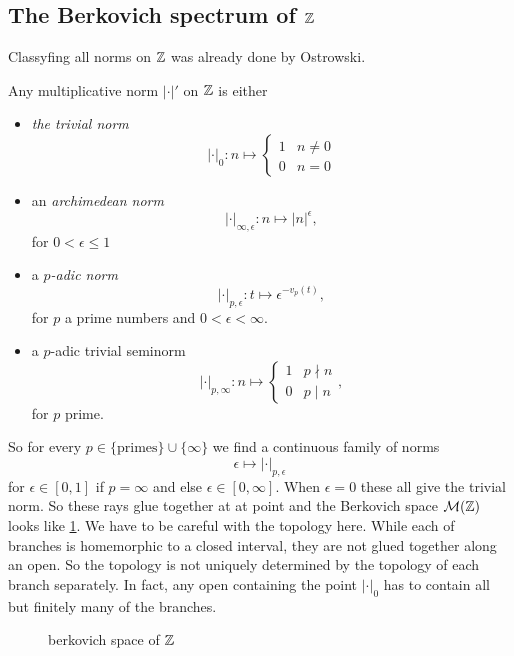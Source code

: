 \subsection{The Berkovich spectrum of $\mathbb{Z}$} \label{sec:the_berkovich_spectrum_of_z}
Classyfing all norms on $\mathbb{Z}$ was already done by Ostrowski.
\begin{theorem}[Ostrowski]\label{thm:ostrowksi}
	Any multiplicative norm $|\cdot |'$ on $\mathbb{Z}$ is either
	\begin{itemize}
		\item \emph{the trivial norm} \[
				|\cdot |_0: n \mapsto \begin{cases}
					1 & n \ne 0 \\
					0 & n = 0
				\end{cases}
			\]
		\item an \emph{archimedean norm} \[
				|\cdot |_{\infty, \epsilon}: n \mapsto |n|^{\epsilon},
			\]
			for $0 <  \epsilon \le 1$
		\item a \emph{$p$-adic norm} \[
				|\cdot |_{p, \epsilon}: t \mapsto \epsilon ^{- v_p(t)},
			\]
			for $p$ a prime numbers and $0 < \epsilon < \infty$. 
		\item a $p$-adic trivial seminorm 
			\[
			|\cdot |_{p, \infty}: n \mapsto \begin{cases}
				1 & p \nmid n \\
				0 & p \mid n
			\end{cases}
			,\] 
			for $p$ prime. 
	\end{itemize}
\end{theorem}
So for every $p \in \{\text{primes}\} \cup \{\infty\} $ we find a continuous family of norms \[
	\epsilon \mapsto|\cdot |_{p, \epsilon}
\] 
for $\epsilon \in [0, 1]$ if $p = \infty$ and else $\epsilon \in [0, \infty]$. 
When $\epsilon = 0$ these all give the trivial norm. 
So these rays glue together at at point and the Berkovich space $\mathcal{M} (\mathbb{Z})$ looks like \cref{fig:berkovich-space-of-z}.
We have to be careful with the topology here. 
While each of branches is homemorphic to a closed interval, they are not glued together along an open. 
So the topology is not uniquely determined by the topology of each branch separately.
In fact, any open containing the point $|\cdot |_0$ has to contain all but finitely many of the branches. 

\begin{figure}[h]
    \centering
    \caption{berkovich space of $\mathbb{Z}$}
    \label{fig:berkovich-space-of-z}
\end{figure}


